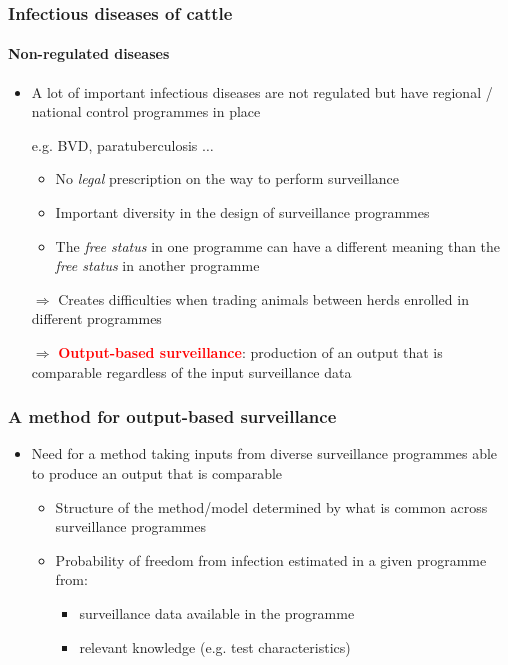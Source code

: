 \documentclass{beamer}
\begin{document}
\begin{frame}
\frametitle{Infectious diseases of cattle}
\framesubtitle{Non-regulated diseases}
 \begin{itemize}
  \item{A lot of important infectious diseases are not regulated but have regional / national control programmes in place}
  \item[]{\scriptsize e.g. BVD, paratuberculosis $\ldots$}
  \begin{itemize}
   \item{No \emph{legal} prescription on the way to perform surveillance}
   \item{Important diversity in the design of surveillance programmes}
   \item{The \emph{free status} in one programme can have a different meaning than the \emph{free status} in another programme}
  \end{itemize}
  \item[$\Rightarrow$]{Creates difficulties when trading animals between herds enrolled in different programmes}
  \item[$\Rightarrow$]{\textcolor{red}{\textbf{Output-based surveillance}}: production of an output that is comparable regardless of the input surveillance data}
    \end{itemize}
\end{frame}

\begin{frame}
\frametitle{A method for output-based surveillance}
\begin{itemize}
\item{Need for a method taking inputs from diverse surveillance programmes able to produce an output that is comparable}
  \begin{itemize}
   \item{Structure of the method/model determined by what is common across surveillance programmes}
   \item{Probability of freedom from infection estimated in a given programme from:}
   \begin{itemize}
    \item{surveillance data available in the programme}
    \item{relevant knowledge (e.g. test characteristics)}
   \end{itemize}
  \end{itemize}
\end{itemize}
\end{frame}
\end{document}
